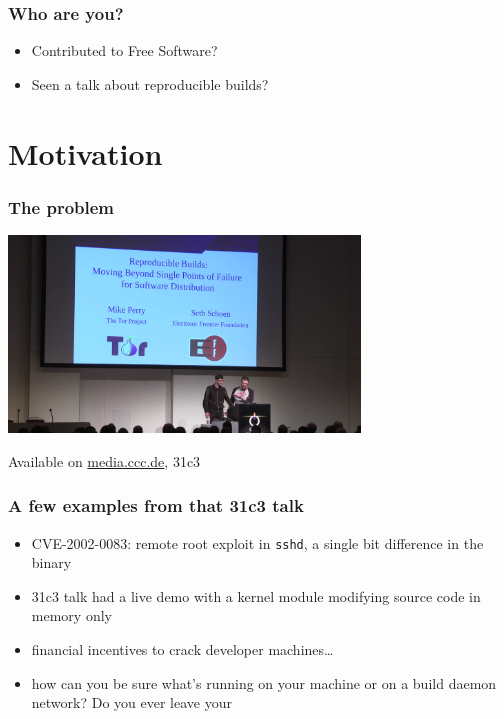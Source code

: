\documentclass[14pt]{beamer}
\begin{document}
\begin{frame}
 \frametitle{Who are you?}
 \begin{itemize}
  \item Contributed to Free Software?
  \item<2> Seen a talk about reproducible builds?
 \end{itemize}
\end{frame}

\section{Motivation}

\begin{frame}
 \frametitle{The problem}

 \begin{center}
  \includegraphics[width=0.7\textwidth]{images/31c3.png}

  Available on \url{media.ccc.de}, 31c3
 \end{center}
\end{frame}

\begin{frame}[fragile]
 \frametitle{A few examples from that 31c3 talk}
 \begin{itemize}
  \item CVE-2002-0083: remote root exploit in \texttt{sshd}, a single bit difference in the binary
  \item<2-5> 31c3 talk had a live demo with a kernel module modifying source code in memory only
  \item<3-5> financial incentives to crack developer machines…
  \item<4-5> {how can you be sure what's running on your machine or on a build
  daemon network? Do you ever leave your} 
 \end{itemize}
\end{frame}
\end{document}

